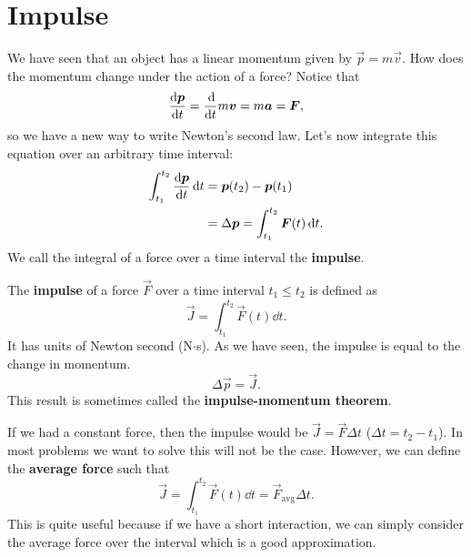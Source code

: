 \documentclass[../classical_mechanics.tex]{subfiles}
\begin{document}
    \section{Impulse}\label{sec:impulse}
        We have seen that an object has a linear momentum given by $\vec{p}=m\vec{v}$.
        How does the momentum change under the action of a force?
        Notice that
        \begin{equation}
            \dv{\vec{p}}{t}=\dv{}{t}m\vec{v}=m\vec{a}=\vec{F},
        \end{equation}
        so we have a new way to write Newton's second law.
        Let's now integrate this equation over an arbitrary time interval:
        \begin{align}
            \int_{t_1}^{t_2}\dv{\vec{p}}{t}\dd{t}&=\vec{p}(t_2)-\vec{p}(t_1)\\
            &=\Delta\vec{p}=\int_{t_1}^{t_2}\vec{F}(t)\dd{t}.
        \end{align}
        We call the integral of a force over a time interval the \textbf{impulse}.
        \begin{definition}
            The \textbf{impulse} of a force $\vec{F}$ over a time interval $t_1\leq t_2$ is defined as
            \begin{equation}
                \vec{J}=\int_{t_1}^{t_2}\vec{F}(t)\dd{t}.
            \end{equation}
            It has units of Newton second (N$\cdot$s). As we have seen, the impulse is equal to the change in momentum.
            \begin{equation}
                \Delta\vec{p}=\vec{J}.
            \end{equation}
            This result is sometimes called the \textbf{impulse-momentum theorem}.
        \end{definition}

        If we had a constant force, then the impulse would be $\vec{J}=\vec{F}\Delta t$ ($\Delta t=t_2-t_1$).
        In most problems we want to solve this will not be the case. However, we can define the \textbf{average force} such that
        \begin{equation}
            \vec{J}=\int_{t_1}^{t_2}\vec{F}(t)\dd{t}=\vec{F}_\text{avg}\Delta t.
        \end{equation}
        This is quite useful because if we have a short interaction, we can simply consider the average force over the interval which is a good approximation.
\end{document}
